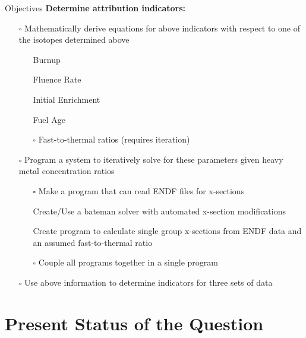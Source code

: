 \documentclass{beamer}
\newcommand{\cmark}{\ding{51}}%
\newcommand{\done}{\rlap{$\square$}{\raisebox{2pt}{\large\hspace{1pt}\cmark}}%
  \hspace{-2.5pt}}
\newcommand{\notdone}{$\square$}
\begin{document}
\begin{frame}[allowframebreaks]{Objectives}
\textbf{\small Determine attribution indicators:}
\begin{itemize}
\item[\notdone]{\small Mathematically derive equations for above indicators with
  respect to one of the isotopes determined above}
  \begin{itemize}
  \item[\tiny\done]{\tiny Burnup}
  \item[\tiny\done]{\tiny Fluence Rate}
  \item[\tiny\done]{\tiny Initial Enrichment}
  \item[\tiny\done]{\tiny Fuel Age}
  \item[\tiny\notdone]{\tiny Fast-to-thermal ratios (requires iteration)}
  \end{itemize}
\item[\notdone]{\small Program a system to iteratively solve for these parameters
  given heavy metal concentration
  ratios}
  \begin{itemize}
  \item[\tiny\notdone]{\tiny Make a program that can read ENDF files for x-sections}
  \item[\tiny\done]{\tiny Create/Use a bateman solver with automated x-section modifications}
  \item[\tiny\done]{\tiny Create program to calculate single group x-sections from
    ENDF data and an assumed
    fast-to-thermal ratio}
  \item[\tiny\notdone]{\tiny Couple all programs together in a single program} 
  \end{itemize}
\item[\notdone]{\small Use above information to determine indicators for three sets of data}
\end{itemize}
\end{frame}



\section{Present Status of the Question}
\begin{frame}
\sectionpage
\end{frame}
\end{document}
